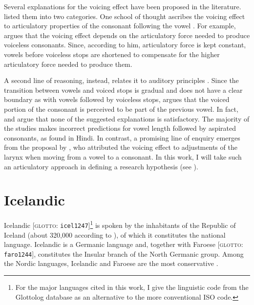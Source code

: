 \documentclass[11pt,a4paper,openany]{memoir}\usepackage[]{graphicx}\usepackage[]{color}
\begin{document}
Several explanations for the voicing effect have been proposed in the literature.
\citet{soskuthy2013} listed them into two categories.
One school of thought ascribes the voicing effect to articulatory properties of the consonant following the vowel \citep{belasco1953,chen1970}.
For example, \citep{belasco1953} argues that the voicing effect depends on the articulatory force needed to produce voiceless consonants.
Since, according to him, articulatory force is kept constant, vowels before voiceless stops are shortened to compensate for the higher articulatory force needed to produce them.

A second line of reasoning, instead, relates it to auditory principles \citep{javkin1976,kluender1988}.
Since the transition between vowels and voiced stops is gradual and does not have a clear boundary as with vowels followed by voiceless stops, \citep{javkin1976} argues that the voiced portion of the consonant is perceived to be part of the previous vowel.
In fact, \citet{maddieson1976} and \citet{durvasula2012} argue that none of the suggested explanations is satisfactory.
The majority of the studies makes incorrect predictions for vowel length followed by aspirated consonants, as found in Hindi.
In contrast, a promising line of enquiry emerges from the proposal by \citet{chomsky1968}, who attributed the voicing effect to adjustments of the larynx when moving from a vowel to a consonant.
In this work, I will take such an articulatory approach in defining a research hypothesis (see ).

\section{Icelandic}
\label{s:icelandic}


Icelandic [\textsc{glotto}: \texttt{icel1247}]\footnote{For the major languages cited in this work, I give the linguistic code from the Glottolog database \citep{hammarstrom2016} as an alternative to the more conventional ISO code.} is spoken by the inhabitants of the Republic of Iceland (about 320,000 according to \citealt{arnason2011}), of which it constitutes the national language.
Icelandic is a Germanic language and, together with Faroese [\textsc{glotto}: \texttt{faro1244}], constitutes the Insular branch of the North Germanic group.
Among the Nordic languages, Icelandic and Faroese are the most conservative \citep{harbert2006,konig2013}.
\end{document}
